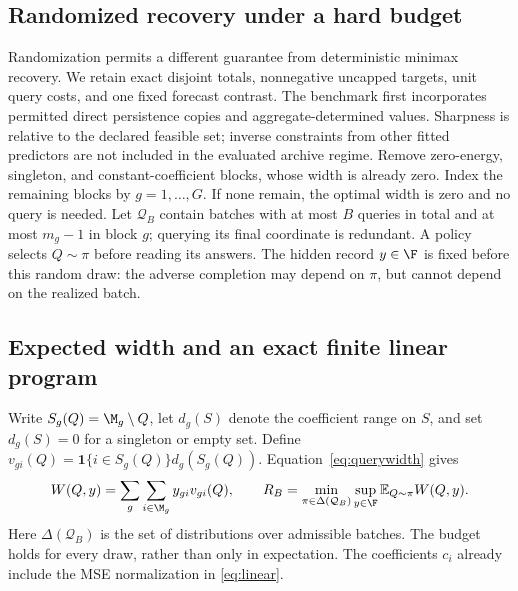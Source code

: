 \subsection{Randomized recovery under a hard budget}
\label{sec:randomized-recovery}

Randomization permits a different guarantee from deterministic minimax
recovery. We retain exact disjoint totals, nonnegative uncapped targets,
unit query costs, and one fixed forecast contrast. The benchmark first incorporates permitted direct persistence copies
and aggregate-determined values. Sharpness is relative to the declared
feasible set; inverse constraints from other fitted predictors are not
included in the evaluated archive regime.
Remove zero-energy, singleton, and constant-coefficient blocks, whose width
is already zero. Index the remaining blocks by $g=1,\ldots,G$.
If none remain, the optimal width is zero and no query is needed.
Let $\mathcal Q_B$ contain batches with at most $B$ queries in total and
at most $m_g-1$ in block $g$; querying its final coordinate is redundant.
A policy selects $Q\sim\pi$ before reading its answers. The hidden record
$y\in\F$ is fixed before this random draw: the adverse completion may
depend on $\pi$, but cannot depend on the realized batch.

\subsection{Expected width and an exact finite linear program}
Write $S_g(Q)=\M_g\setminus Q$, let $d_g(S)$ denote the coefficient range
on $S$, and set $d_g(S)=0$ for a singleton or empty set. Define
$v_{gi}(Q)=\boldsymbol{1}\{i\in S_g(Q)\}d_g(S_g(Q))$.
Equation~\eqref{eq:querywidth} gives
\begin{equation}
 W(Q,y)=\sum_g\sum_{i\in\M_g}y_{gi} v_{gi}(Q),\qquad
 R_B=\min_{\pi\in\Delta(\mathcal Q_B)}\sup_{y\in\F}
       \mathbb E_{Q\sim\pi}W(Q,y).
 \label{eq:random-objective}
\end{equation}
Here $\Delta(\mathcal Q_B)$ is the set of distributions over admissible
batches. The budget holds for every draw, rather than only in expectation.
The coefficients $c_i$ already include the MSE normalization in
\eqref{eq:linear}.

